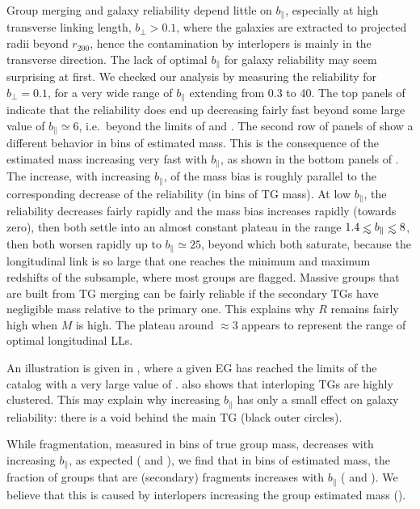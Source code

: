 Group merging and galaxy reliability depend little on $b_\parallel$, especially
at high transverse linking length, $b_\perp > 0.1$, where the galaxies are
extracted to projected radii beyond $r_{200}$, hence the contamination by
interlopers is mainly in the transverse direction. The lack of optimal
$b_\parallel$ for galaxy reliability may seem surprising at first. We checked
our analysis by measuring the reliability for $b_\perp=0.1$, for a very wide
range of $b_\parallel$ extending from 0.3 to 40.
%
The top panels of  indicate that the
reliability does end up decreasing fairly fast beyond some large value of
$b_\parallel \simeq 6$, i.e.\ beyond the limits of
 and . The second
row of panels of  show a different behavior
in bins of estimated mass. This is the consequence of the estimated mass
increasing very fast with $b_\parallel$, as shown in the bottom panels of
. The increase, with increasing
$b_\parallel$, of the mass bias is roughly parallel to the corresponding
decrease of the reliability (in bins of TG mass). At low $b_\parallel$, the
reliability decreases fairly rapidly and the mass bias increases rapidly
(towards zero), then both settle into an almost constant plateau in the range
$1.4 \la b_\parallel \la 8$, then both worsen rapidly up to $b_\parallel\simeq
25$, beyond which both saturate, because the longitudinal link is so large that
one reaches the minimum and maximum redshifts of the subsample, where most
groups are flagged. Massive groups that are built from TG merging can be fairly
reliable if the secondary TGs have negligible mass relative to the primary one.
This explains why $R$ remains fairly high when $M$ is high. The plateau around
\bpar$\approx 3$ appears to represent the range of optimal longitudinal LLs.

An illustration is given in , where a given EG has
reached the limits of the catalog with a very large value of \bpar{}.
 also shows that interloping TGs are highly clustered.
This may explain why increasing $b_\parallel$ has only a small effect on
galaxy reliability: there is a void behind the main TG (black outer
circles).

While fragmentation, measured in bins of true group mass, decreases with
increasing $b_\parallel$, as expected ( and
), we find that in bins of estimated mass, the
fraction of groups that are (secondary) fragments increases with $b_\parallel$
( and ).
We believe that this is caused by interlopers increasing the group estimated
mass ().

